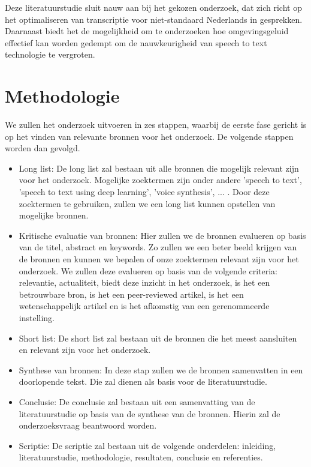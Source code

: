 Deze literatuurstudie sluit nauw aan bij het gekozen onderzoek, dat zich richt op het optimaliseren van transcriptie voor niet-standaard Nederlands in gesprekken. Daarnaast biedt het de mogelijkheid om te onderzoeken hoe omgevingsgeluid effectief kan worden gedempt om de nauwkeurigheid van speech to text technologie te vergroten.


\section{Methodologie}%
\label{sec:methodologie}

We zullen het onderzoek uitvoeren in zes stappen, waarbij de eerste fase gericht is op het vinden van relevante bronnen voor het onderzoek. De volgende stappen worden dan gevolgd.
\begin{itemize}
    \item Long list: De long list zal bestaan uit alle bronnen die mogelijk relevant zijn voor het onderzoek. Mogelijke zoektermen zijn onder andere 'speech to text', 'speech to text using deep learning', 'voice synthesis', ... . Door deze zoektermen te gebruiken, zullen we een long list kunnen opstellen van mogelijke bronnen.
    \item Kritische evaluatie van bronnen: Hier zullen we de bronnen evalueren op basis van de titel, abstract en keywords. Zo zullen we een beter beeld krijgen van de bronnen en kunnen we bepalen of onze zoektermen relevant zijn voor het onderzoek. We zullen deze evalueren op basis van de volgende criteria: relevantie, actualiteit, biedt deze inzicht in het onderzoek, is het een betrouwbare bron, is het een peer-reviewed artikel, is het een wetenschappelijk artikel en is het afkomstig van een gerenommeerde instelling.
    \item Short list: De short list zal bestaan uit de bronnen die het meest aansluiten en relevant zijn voor het onderzoek.
    \item Synthese van bronnen: In deze stap zullen we de bronnen samenvatten in een doorlopende tekst. Die zal dienen als basis voor de literatuurstudie.
    \item Conclusie: De conclusie zal bestaan uit een samenvatting van de literatuurstudie op basis van de synthese van de bronnen. Hierin zal de onderzoeksvraag beantwoord worden.
    \item Scriptie: De scriptie zal bestaan uit de volgende onderdelen: inleiding, literatuurstudie, methodologie, resultaten, conclusie en referenties.
\end{itemize}

